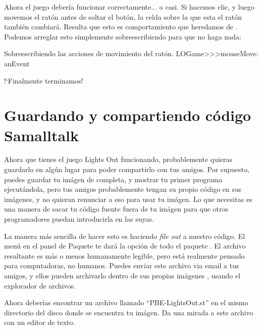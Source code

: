 \documentclass[a4paper,10pt,twoside]{book}
\begin{document}

Ahora el juego deber\'ia funcionar correctamente... o casi. Si hacemos clic, y luego movemos el rat\'on antes de soltar el bot\'on, la celda sobre la que esta el rat\'on tambi\'en cambiar\'a. Resulta que esto es comportamiento que heredamos de . Podemos arreglar esto simplemente sobreescribiendo  para que no haga nada:

\begin{method}[mouseMove:]{Sobreescribiendo las acciones de movimiento del rat\'on.}
LOGame>>>mouseMove: anEvent
\end{method}

!`Finalmente terminamos!

\section{Guardando y compartiendo c\'odigo Samalltalk}

Ahora que tienes el juego Lights Out funcionando, probablemente quieras guardarlo en alg\'un lugar para poder compartirlo con tus amigos. Por supuesto, puedes guardar tu im\'agen de \pharo completa, y mostrar tu primer programa ejecut\'andola, pero tus amigos probablemente tengan su propio c\'odigo en sus im\'agenes, y no quieran renunciar a eso para usar tu im\'agen. 
Lo que necesitas es una manera de sacar tu c\'odigo fuente fuera de tu im\'agen \pharo para que otros programadores puedan introducirla en las suyas. 

La manera m\'as sencilla de hacer esto es haciendo \emph{file out} a nuestro c\'odigo. El men\'u \actclick en el panel de Paquete te dar\'a la opci\'on  de todo el paquete .
El archivo resultante es m\'as o menos humanamente legible, pero est\'a realmente pensado para computadoras, no humanos. 
Puedes enviar este archivo via email a tus amigos, y ellos pueden archivarlo dentro de sus propias im\'agenes \pharo, usando el explorador de archivos.

Ahora deber\'ias encontrar un archivo llamado ``PBE-LightsOut.st'' en el mismo directorio del disco donde se encuentra tu im\'agen.
Da una mirada a este archivo con un editor de texto.
\end{document}
